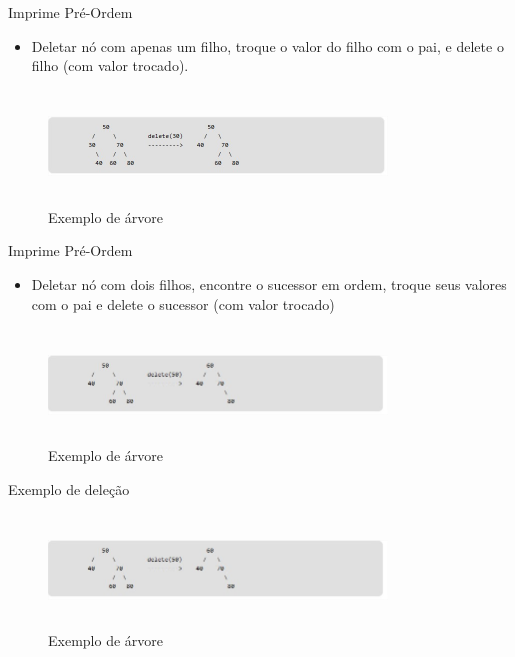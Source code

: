 \begin{frame}
	\begin{block}{Imprime Pré-Ordem}
		\begin{itemize}
			\item Deletar nó com apenas um filho, troque o valor do filho com o pai, e delete o filho (com valor trocado).
		\end{itemize}
		\begin{figure}[!htb]
			\centering	  				
			\includegraphics[height=3cm, width = 9cm]{./pic/delecao2.jpg}
			\caption{Exemplo de árvore \cite{GEEKS_2018}}
		\end{figure}
	\end{block}
\end{frame}

\begin{frame}
	\begin{block}{Imprime Pré-Ordem}
		\begin{itemize}
			\item Deletar nó com dois filhos, encontre o sucessor em ordem, troque seus valores com  o pai e delete o sucessor (com valor trocado)
		\end{itemize}
		\begin{figure}[!htb]
			\centering	  				
			\includegraphics[height=3cm, width = 9cm]{./pic/delecao3.jpg}
			\caption{Exemplo de árvore \cite{GEEKS_2018}}
		\end{figure}
	\end{block}
\end{frame}

\begin{frame}
	\begin{block}{Exemplo de deleção}
		\begin{figure}[!htb]
			\centering	  				
			\includegraphics[height=3cm, width = 9cm]{./pic/delecao3.jpg}
			\caption{Exemplo de árvore \cite{GEEKS_2018}}
		\end{figure}
	\end{block}
\end{frame}

